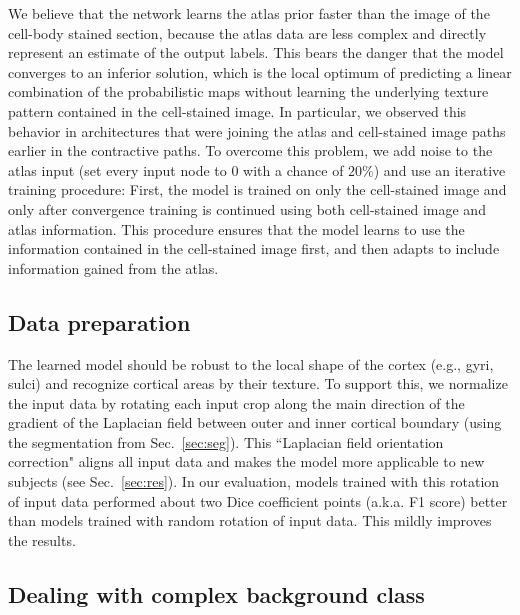 \documentclass{article}
\begin{document}
We believe that the network learns the atlas prior faster than the image of the cell-body stained section, because the atlas data are less complex and directly represent an estimate of the output labels.
This bears the danger that the model converges to an inferior solution, which is the local optimum of predicting a linear combination of the probabilistic maps without learning the underlying texture pattern contained in the cell-stained image.
In particular, we observed this behavior in architectures that were joining the atlas and cell-stained image paths earlier in the contractive paths. %
To overcome this problem, we add noise to the atlas input (set every input node to $0$ with a chance of $20\%$) and use an iterative training procedure:
First, the model is trained on only the cell-stained image and only after convergence training is continued using both cell-stained image and atlas information.
This procedure ensures that the model learns to use the information contained in the cell-stained image first, and then adapts to include information gained from the atlas.

\vspace*{-.5\baselineskip}
\subsection{Data preparation}
\label{sec:arch:train}
\vspace*{-.5\baselineskip}

The learned model should be robust to the local shape of the cortex (e.g., gyri, sulci) and recognize cortical areas by their texture.
To support this, we normalize the input data by rotating each input crop along the main direction of the gradient of the Laplacian field between outer and inner cortical boundary (using the segmentation from Sec.~\ref{sec:seg}).
This ``Laplacian field orientation correction" aligns all input data and makes the model more applicable to new subjects (see Sec.~\ref{sec:res}). In our evaluation, models trained with this rotation of input data performed about two Dice coefficient points (a.k.a. F1 score) better than models trained with random rotation of input data. This mildly improves the results.

\vspace*{-.5\baselineskip}
\subsection{Dealing with complex background class}
\label{sec:arch:labels}
\vspace*{-.5\baselineskip}
\end{document}

